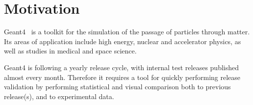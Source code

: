 \section{Motivation}
\label{sec-motivation}
Geant4~\cite{Geant4} is a toolkit for the simulation of the passage of particles through matter. Its areas of application include high energy, nuclear and accelerator physics, as well as studies in medical and space science. 

Geant4 is following a yearly release cycle, with internal test releases published almost every month. Therefore it requires a tool for quickly performing release validation by performing statistical and visual comparison both to previous release(s), and to experimental data. 
%
